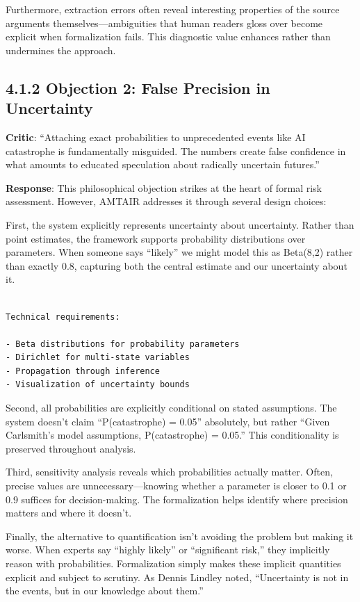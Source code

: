 \documentclass[
  11pt,
  letterpaper,
]{book}
\begin{document}
Furthermore, extraction errors often reveal interesting properties of
the source arguments themselves---ambiguities that human readers gloss
over become explicit when formalization fails. This diagnostic value
enhances rather than undermines the approach.

\subsection*{4.1.2 Objection 2: False Precision in
Uncertainty}\label{sec-false-precision}

\textbf{Critic}: ``Attaching exact probabilities to unprecedented events
like AI catastrophe is fundamentally misguided. The numbers create false
confidence in what amounts to educated speculation about radically
uncertain futures.''

\textbf{Response}: This philosophical objection strikes at the heart of
formal risk assessment. However, AMTAIR addresses it through several
design choices:

First, the system explicitly represents uncertainty about uncertainty.
Rather than point estimates, the framework supports probability
distributions over parameters. When someone says ``likely'' we might
model this as Beta(8,2) rather than exactly 0.8, capturing both the
central estimate and our uncertainty about it.

\begin{verbatim}

Technical requirements:

- Beta distributions for probability parameters
- Dirichlet for multi-state variables
- Propagation through inference
- Visualization of uncertainty bounds
\end{verbatim}

Second, all probabilities are explicitly conditional on stated
assumptions. The system doesn't claim ``P(catastrophe) = 0.05''
absolutely, but rather ``Given Carlsmith's model assumptions,
P(catastrophe) = 0.05.'' This conditionality is preserved throughout
analysis.

Third, sensitivity analysis reveals which probabilities actually matter.
Often, precise values are unnecessary---knowing whether a parameter is
closer to 0.1 or 0.9 suffices for decision-making. The formalization
helps identify where precision matters and where it doesn't.

Finally, the alternative to quantification isn't avoiding the problem
but making it worse. When experts say ``highly likely'' or ``significant
risk,'' they implicitly reason with probabilities. Formalization simply
makes these implicit quantities explicit and subject to scrutiny. As
Dennis Lindley noted, ``Uncertainty is not in the events, but in our
knowledge about them.''
\end{document}
